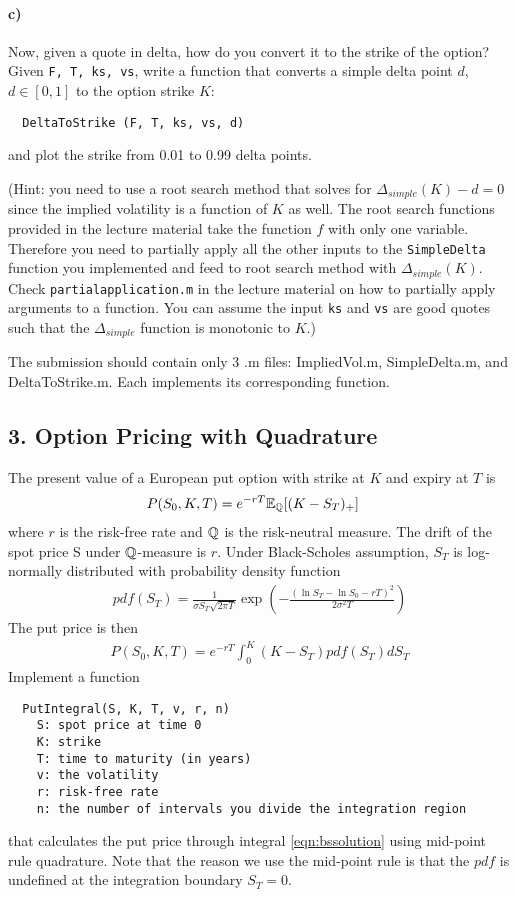\documentclass[12pt,a4paper,hidelinks,fleqn]{article}            %
\begin{document}
\paragraph{c)} Now, given a quote in delta, how do you convert it to the strike of the option?
Given \verb=F, T, ks, vs=, write a function that converts a simple delta point $d$, $d \in [0, 1]$ to the option strike $K$:
\begin{verbatim}
  DeltaToStrike (F, T, ks, vs, d)
\end{verbatim}
and plot the strike from 0.01 to 0.99 delta points.

(Hint: you need to use a root search method that solves for $\Delta_{simple}(K) - d = 0$ since the implied volatility is a function of $K$ as well.
The root search functions provided in the lecture material take the function $f$ with only one variable. 
Therefore you need to partially apply all the other inputs to the \verb=SimpleDelta= function you implemented and feed to root search method with $\Delta_{simple}(K)$.
Check \verb=partialapplication.m= in the lecture material on how to partially apply arguments to a function.
You can assume the input \verb=ks= and \verb=vs= are good quotes such that the $\Delta_{simple}$ function is monotonic to $K$.)


The submission should contain only 3 .m files: ImpliedVol.m, SimpleDelta.m, and DeltaToStrike.m. Each implements its corresponding function.

\subsection*{3. Option Pricing with Quadrature}
The present value of a European put option with strike at $K$ and expiry at $T$ is
\begin{align*}
P(S_0, K, T) & = e^{-rT}\mathbb{E}_{\mathbb{Q}} [(K - S_T)_+]
\end{align*}
where $r$ is the risk-free rate and $\mathbb{Q}$ is the risk-neutral measure.
The drift of the spot price S under $\mathbb{Q}$-measure is $r$.
Under Black-Scholes assumption, $S_T$ is log-normally distributed with probability density function
\begin{align*}
pdf(S_T) = \frac{1}{\sigma S_T\sqrt{2\pi T}} \exp\left(- \frac{(\ln S_T - \ln S_0 - rT)^2}{ 2\sigma^2 T} \right)
\end{align*}
The put price is then
\begin{align}
\label{eqn:bssolution}
  P(S_0, K, T) = e^{-rT}\int_0^K \left(K - S_T\right) pdf(S_T) dS_T 
\end{align}
Implement a function
\vspace{-6mm}
\begin{verbatim}
  PutIntegral(S, K, T, v, r, n)
    S: spot price at time 0
    K: strike
    T: time to maturity (in years)
    v: the volatility
    r: risk-free rate
    n: the number of intervals you divide the integration region 
\end{verbatim}
\vspace{-6mm}
that calculates the put price through integral \eqref{eqn:bssolution} using mid-point rule quadrature.
Note that the reason we use the mid-point rule is that the $pdf$ is undefined at the integration boundary $S_T=0$.
\end{document}
